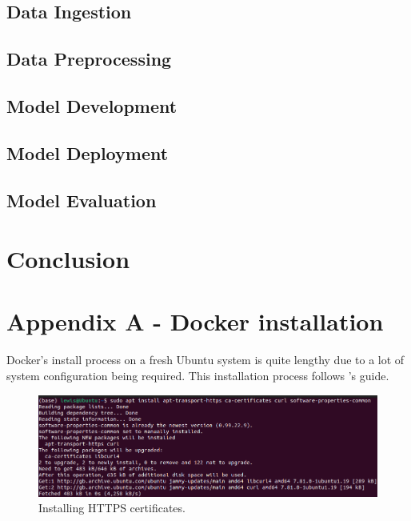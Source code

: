 \documentclass[12pt]{report}
\begin{document}


\section{Data Ingestion}\label{sec:ImpIngestion}

\section{Data Preprocessing}\label{sec:ImpPreprocessing}

\section{Model Development}\label{sec:ImpDevelopment}

\section{Model Deployment}\label{sec:ImpDeployment}

\section{Model Evaluation}\label{sec:ImpEvaluation}

\chapter*{Conclusion}


\chapter*{Appendix A - Docker installation}
Docker's install process on a fresh Ubuntu system is quite lengthy due to a lot of 
system configuration being required. This installation process follows 
\textcite{digitalocean_how_nodate}'s guide.

\begin{figure}[H]
    \centering
    \includegraphics[width=\linewidth]{Implementation/Docker/Installation/1.png}
    \caption{Installing HTTPS certificates.}
    \label{fig:DockerInstall1}
\end{figure}
\end{document}
